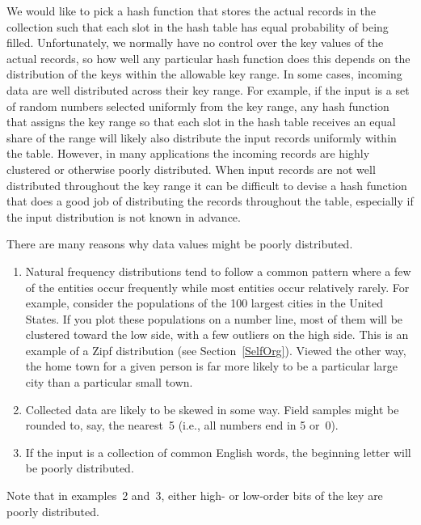 We would like to pick a hash function that stores the
actual records in the collection such that each slot in the hash table 
has equal probability of being filled.
Unfortunately, we normally have no control over the key values of the
actual records, so how well any particular hash function does this
depends on the distribution of the keys within the allowable key range.
In some cases, incoming data are well distributed across their key
range.
For example, if the input is a set of random numbers selected
uniformly from the key range,
any hash function that assigns the key range so that each slot in the
hash table receives an equal share of the range will likely also
distribute the input records uniformly within the table.
However, in many applications the incoming records are highly
clustered or otherwise poorly distributed.
When input records are not well distributed throughout the key range
it can be difficult to devise a hash function that does a good job of
distributing the records throughout the table, especially if the 
input distribution is not known in advance.

There are many reasons why data values might be poorly distributed.

\begin{enumerate}
\item
Natural frequency distributions tend to follow a common pattern where
a few of the entities occur frequently while most entities occur
relatively rarely.
For example, consider the populations of the 100 largest cities in the
United States.
If you plot these populations on a number line, most of them
will be clustered toward the low side, with a few
outliers on the high side.
This is an example of a Zipf distribution
(see Section~\ref{SelfOrg}).
Viewed the other way, the home town for a given person is far more
likely to be a particular large city than a particular small town.

\item
Collected data are likely to be skewed in some way.
Field samples might be rounded to, say, the
nearest~5 (i.e., all numbers end in 5 or~0).

\item
If the input is a collection of common English words, the beginning
letter will be poorly distributed.
\end{enumerate}

\noindent Note that in examples~2 and~3, either high- or
low-order bits of the key are poorly distributed.


